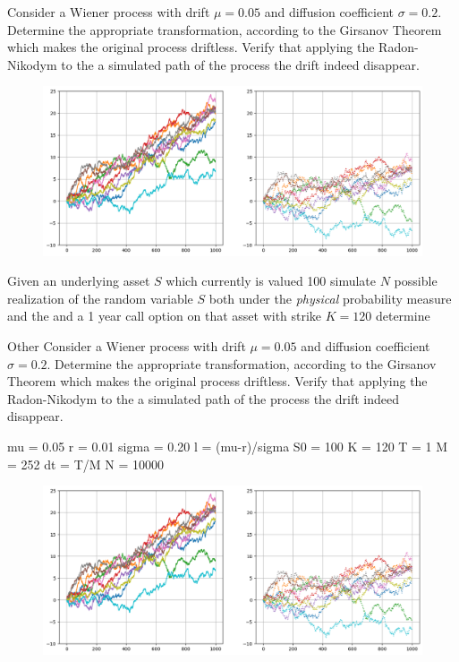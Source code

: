 \documentclass[12pt,a4paper]{article}
\begin{document}
\begin{question}
Consider a Wiener process with drift $\mu=0.05$ and diffusion coefficient $\sigma=0.2$. Determine the appropriate transformation, according to the Girsanov Theorem which makes the original process driftless. Verify that applying the Radon-Nikodym to the a simulated path of the process the drift indeed disappear.

\begin{figure}[htbp]
	\begin{center}
		\includegraphics[width=0.5\linewidth]{addons/brownian_motion_girsanov}
	\end{center}
	\label{fig:brownian_motion_girsanov}
\end{figure}
\end{question}

\begin{question}
Given an underlying asset $S$ which currently is valued 100 simulate $N$ possible realization of the random variable $S$ both under the \emph{physical} probability measure and the 
and a 1 year call option on that asset with strike $K=120$ determine 

Other  Consider a Wiener process with drift $\mu=0.05$ and diffusion coefficient $\sigma=0.2$. Determine the appropriate transformation, according to the Girsanov Theorem which makes the original process driftless. Verify that applying the Radon-Nikodym to the a simulated path of the process the drift indeed disappear.

mu = 0.05
r = 0.01
sigma = 0.20
l = (mu-r)/sigma
S0 = 100
K = 120
T = 1
M = 252
dt = T/M
N = 10000
\begin{figure}[htbp]
	\begin{center}
		\includegraphics[width=0.5\linewidth]{addons/brownian_motion_girsanov}
	\end{center}
	\label{fig:brownian_motion_girsanov}
\end{figure}
\end{question}
\end{document}
